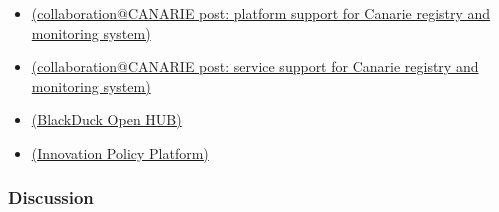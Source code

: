 \begin{itemize}
\item
\href{https://collaboration.canarie.ca/elgg/file/view/2471/research-platform-support-for-the-canarie-registry-and-monitoring-system-revision-3}{(collaboration@CANARIE post: platform support for Canarie registry and monitoring system)}

\item
\href{https://collaboration.canarie.ca/elgg/file/view/2453/research-service-support-for-canarie-registry-and-monitoring-system-revision-7}{(collaboration@CANARIE post: service support for Canarie registry and monitoring system)}

\item
\href{https://www.openhub.net/}{(BlackDuck Open HUB)}

\item
\href{https://www.innovationpolicyplatform.org/frontpage}{(Innovation Policy Platform)}


\end{itemize}



\subsubsection{Discussion}

